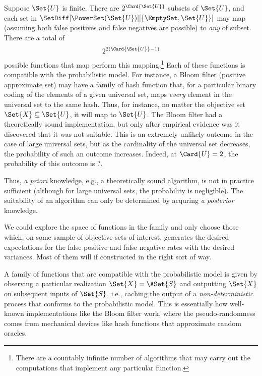 \documentclass[ ../main.tex]{subfiles}
\begin{document}
Suppose $\Set{U}$ is finite. There are $2^{\Card{\Set{U}}}$ subsets of
$\Set{U}$, and each set in $\SetDiff[\PowerSet(\Set{U})][\{\EmptySet,\Set{U}\}]$ 
may map (assuming both false positives and false negatives are possible) to 
\emph{any} of subset. There are a total of
\begin{equation}
    2^{2(\Card{\Set{U}} - 1)}
\end{equation}
possible functions that map perform this 
mapping.\footnote{There are a countably infinite number of 
algorithms that may carry out the computations that 
implement any particular function.} Each of these functions 
is compatible with the probabilistic model. For instance, a 
Bloom filter (positive approximate set) may have a family of 
hash function that, for a particular binary coding of the 
elements of a given universal set, maps \emph{every} element 
in the universal set to the same hash. Thus, for instance, no 
matter the objective set $\Set{X} \subseteq \Set{U}$, it will 
map to $\Set{U}$. The Bloom filter had a theoretically sound 
implementation, but only after empirical evidence was it 
discovered that it was not suitable. This is an extremely 
unlikely outcome in the case of large universal sets, but as 
the cardinality of the universal set decreases, the 
probability of such an outcome increases. Indeed, at 
$\Card{U} = 2$, the probability of this outcome is $?$.

Thus, \emph{a priori} knowledge, e.g., a theoretically sound 
algorithm, is not in practice sufficient (although for large 
universal sets, the probability is negligible). The 
suitability of an algorithm can only be determined by 
acquring \emph{a posterior} knowledge.

We could explore the space of functions in the family and 
only choose those which, on some sample of objective sets of 
interest, generates the desired expectations for the false 
positive and false negative rates with the desired variances. 
Most of them will if constructed in the right sort of way.


A family of functions that are compatible with the 
probabilistic model is given by observing a particular 
realization $\Set{X} = \ASet{S}$ and outputting 
$\Set{X}$ on subsequent inputs of $\Set{S}$, i.e., caching 
the output of a \emph{non-deterministic} process that 
conforms to the probabilistic model. This is essentially how 
well-known implementations like the Bloom filter work, where 
the pseudo-randomness comes from mechanical devices like hash 
functions that approximate random oracles.
\end{document}
